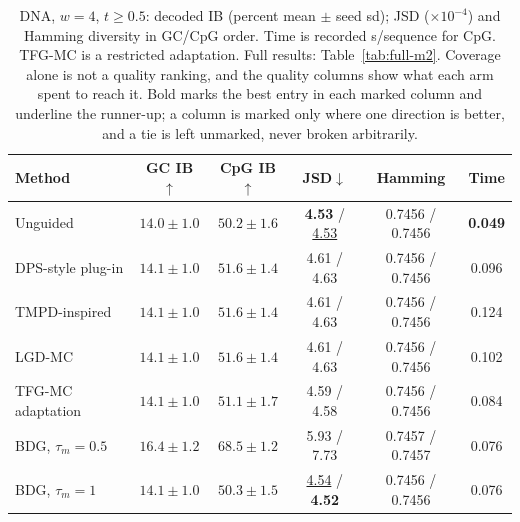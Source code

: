 \documentclass{article}
\begin{document}
\begin{table}[!htbp]
\centering\small\setlength{\tabcolsep}{4pt}
\caption{DNA, $w=4$, $t\ge0.5$: decoded IB (percent mean $\pm$ seed sd); JSD ($\times10^{-4}$) and Hamming diversity in GC/CpG order. Time is recorded s/sequence for CpG. TFG-MC is a restricted adaptation. Full results: Table~\ref{tab:full-m2}. Coverage alone is not a quality ranking, and the quality columns show what each arm spent to reach it. Bold marks the best entry in each marked column and underline the runner-up; a column is marked only where one direction is better, and a tie is left unmarked, never broken arbitrarily.}
\label{tab:m2-late}
\begin{tabular}{lccccc}
\toprule
Method & GC IB$\uparrow$ & CpG IB$\uparrow$ & JSD$\downarrow$ & Hamming & Time\\
\midrule
Unguided & $14.0\pm1.0$ & $50.2\pm1.6$ & \textbf{4.53} / \underline{4.53}& 0.7456 / 0.7456 & \textbf{0.049}\\
DPS-style plug-in & $14.1\pm1.0$ & $51.6\pm1.4$ & 4.61 / 4.63& 0.7456 / 0.7456 & 0.096\\
TMPD-inspired & $14.1\pm1.0$ & $51.6\pm1.4$ & 4.61 / 4.63& 0.7456 / 0.7456 & 0.124\\
LGD-MC & $14.1\pm1.0$ & $51.6\pm1.4$ & 4.61 / 4.63& 0.7456 / 0.7456 & 0.102\\
TFG-MC adaptation & $14.1\pm1.0$ & $51.1\pm1.7$ & 4.59 / 4.58& 0.7456 / 0.7456 & 0.084\\
BDG, $\tau_m=0.5$ & $\mathbf{16.4\pm1.2}$& $\mathbf{68.5\pm1.2}$& 5.93 / 7.73& 0.7457 / 0.7457 & 0.076\\
BDG, $\tau_m=1$ & $14.1\pm1.0$ & $50.3\pm1.5$ & \underline{4.54} / \textbf{4.52}& 0.7456 / 0.7456 & 0.076\\
\bottomrule
\end{tabular}
\end{table}
\end{document}
